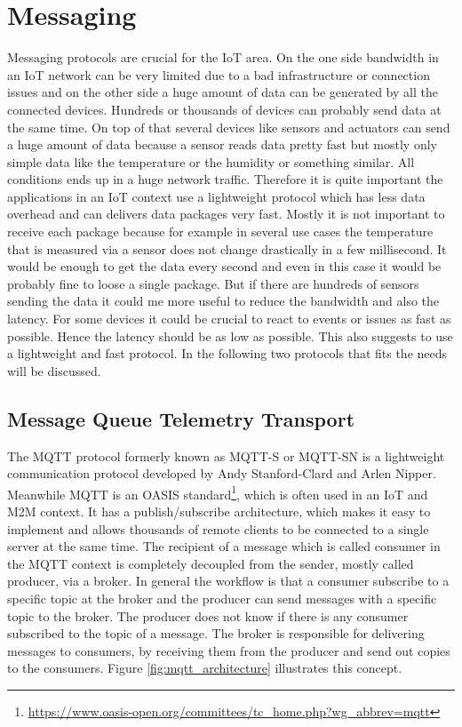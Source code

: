 \section{Messaging}
Messaging protocols are crucial for the \ac{IoT} area.
On the one side bandwidth in an \ac{IoT} network can be very limited due to a bad infrastructure or connection issues and on the other side a huge amount of data can be generated by all the connected devices.
Hundreds or thousands of devices can probably send data at the same time.
On top of that several devices like sensors and actuators can send a huge amount of data because a sensor reads data pretty fast but mostly only simple data like the temperature or the humidity or something similar.
All conditions ends up in a huge network traffic.
Therefore it is quite important the applications in an \ac{IoT} context use a lightweight protocol which has less data overhead and can delivers data packages very fast.
Mostly it is not important to receive each package because for example in several use cases the temperature that is measured via a sensor does not change drastically in a few millisecond.
It would be enough to get the data every second and even in this case it would be probably fine to loose a single package.
But if there are hundreds of sensors sending the data it could me more useful to reduce the bandwidth and also the latency.
For some devices it could be crucial to react to events or issues as fast as possible.
Hence the latency should be as low as possible.
This also suggests to use a lightweight and fast protocol.
In the following two protocols that fits the needs will be discussed.

\subsection{Message Queue Telemetry Transport}
\label{section:MQTT}
The \ac{MQTT} protocol formerly known as MQTT-S or MQTT-SN is a lightweight communication protocol developed by Andy Stanford-Clard and Arlen Nipper.\autocite[cf.]{MQTT:FAQ}
Meanwhile \ac{MQTT} is an \ac{OASIS} standard\footnote{\url{https://www.oasis-open.org/committees/tc_home.php?wg_abbrev=mqtt}}, which is often used in an \ac{IoT} and \ac{M2M} context.\autocite[cf.][p. 5]{lampkin:2012:mqtt}
It has a publish/subscribe architecture, which makes it easy to implement and allows thousands of remote clients to be connected to a single server at the same time.\autocite[cf.][p. 5]{lampkin:2012:mqtt}
The recipient of a message which is called consumer in the \ac{MQTT} context is completely decoupled from the sender, mostly called producer, via a broker.
In general the workflow is that a consumer subscribe to a specific topic at the broker and the producer can send messages with a specific topic to the broker.
The producer does not know if there is any consumer subscribed to the topic of a message.
The broker is responsible for delivering messages to consumers, by receiving them from the producer and send out copies to the consumers.
Figure \ref{fig:mqtt_architecture} illustrates this concept.

